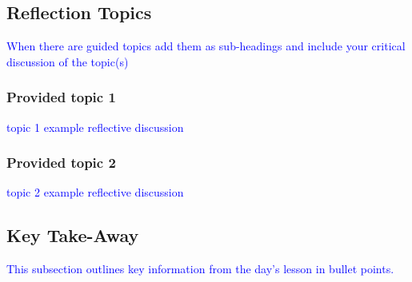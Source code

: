 {%
\subsection{Reflection Topics}

{\textcolor{blue}{When there are guided topics add them as sub-headings and include your critical discussion of the topic(s)}}

\blindtext[1] %

\blindtext[1] %

\subsubsection{Provided topic 1}

{\textcolor{blue}{topic 1 example reflective discussion}}

\blindtext[1] %

\blindtext[1] %

\subsubsection{Provided topic 2}

{\textcolor{blue}{topic 2 example reflective discussion}}




\subsection{Key Take-Away}

{\textcolor{blue}{This subsection outlines key information from the day's lesson in bullet points.}}

}
